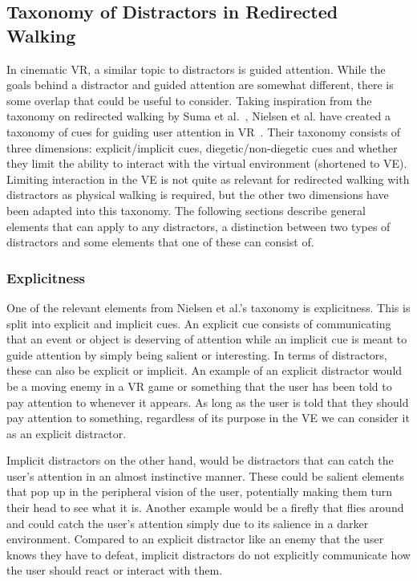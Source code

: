 \subsection{Taxonomy of Distractors in Redirected Walking}\label{sec:distractorTaxonomy}
In cinematic VR, a similar topic to distractors is guided attention. While the goals behind a distractor and guided attention are somewhat different, there is some overlap that could be useful to consider. Taking inspiration from the taxonomy on redirected walking by Suma et al.~\cite{suma2012taxonomy}, Nielsen et al. have created a taxonomy of cues for guiding user attention in VR~\cite{nielsen2016missing}. Their taxonomy consists of three dimensions: explicit/implicit cues, diegetic/non-diegetic cues and whether they limit the ability to interact with the virtual environment (shortened to VE). Limiting interaction in the VE is not quite as relevant for redirected walking with distractors as physical walking is required, but the other two dimensions have been adapted into this taxonomy. The following sections describe general elements that can apply to any distractors, a distinction between two types of distractors and some elements that one of these can consist of. 
\subsubsection{Explicitness}
One of the relevant elements from Nielsen et al.'s taxonomy is explicitness. This is split into explicit and implicit cues. An explicit cue consists of communicating that an event or object is deserving of attention while an implicit cue is meant to guide attention by simply being salient or interesting. In terms of distractors, these can also be explicit or implicit. An example of an explicit distractor would be a moving enemy in a VR game or something that the user has been told to pay attention to whenever it appears. As long as the user is told that they should pay attention to something, regardless of its purpose in the VE we can consider it as an explicit distractor. 

Implicit distractors on the other hand, would be distractors that can catch the user's attention in an almost instinctive manner. These could be salient elements that pop up in the peripheral vision of the user, potentially making them turn their head to see what it is. Another example would be a firefly that flies around and could catch the user's attention simply due to its salience in a darker environment. Compared to an explicit distractor like an enemy that the user knows they have to defeat, implicit distractors do not explicitly communicate how the user should react or interact with them. 

